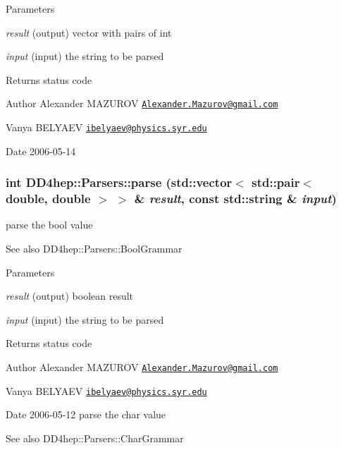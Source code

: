 \begin{DoxyParams}{Parameters}
\item[{\em result}](output) vector with pairs of int \item[{\em input}](input) the string to be parsed \end{DoxyParams}
\begin{DoxyReturn}{Returns}
status code
\end{DoxyReturn}
\begin{DoxyAuthor}{Author}
Alexander MAZUROV \href{mailto:Alexander.Mazurov@gmail.com}{\tt Alexander.Mazurov@gmail.com} 

Vanya BELYAEV \href{mailto:ibelyaev@physics.syr.edu}{\tt ibelyaev@physics.syr.edu} 
\end{DoxyAuthor}
\begin{DoxyDate}{Date}
2006-\/05-\/14 
\end{DoxyDate}
\hypertarget{namespace_d_d4hep_1_1_parsers_ad0d0bfb1ee52c6c6fe6000325562b1fa}{
\subsubsection[{parse}]{\setlength{\rightskip}{0pt plus 5cm}int DD4hep::Parsers::parse (std::vector$<$ std::pair$<$ double, double $>$ $>$ \& {\em result}, \/  const std::string \& {\em input})}}
\label{namespace_d_d4hep_1_1_parsers_ad0d0bfb1ee52c6c6fe6000325562b1fa}


parse the {\ttfamily bool} value \begin{DoxySeeAlso}{See also}
DD4hep::Parsers::BoolGrammar 
\end{DoxySeeAlso}

\begin{DoxyParams}{Parameters}
\item[{\em result}](output) boolean result \item[{\em input}](input) the string to be parsed \end{DoxyParams}
\begin{DoxyReturn}{Returns}
status code
\end{DoxyReturn}
\begin{DoxyAuthor}{Author}
Alexander MAZUROV \href{mailto:Alexander.Mazurov@gmail.com}{\tt Alexander.Mazurov@gmail.com} 

Vanya BELYAEV \href{mailto:ibelyaev@physics.syr.edu}{\tt ibelyaev@physics.syr.edu} 
\end{DoxyAuthor}
\begin{DoxyDate}{Date}
2006-\/05-\/12 parse the {\ttfamily char} value 
\end{DoxyDate}
\begin{DoxySeeAlso}{See also}
DD4hep::Parsers::CharGrammar 
\end{DoxySeeAlso}


